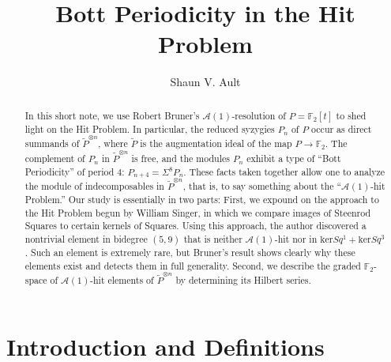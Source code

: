 \documentclass{amsart}
\theoremstyle{plain}
\theoremstyle{definition}
\theoremstyle{remark}
\begin{document}
\title{Bott Periodicity in the Hit Problem}

\author{Shaun V. Ault}

\address{Department of Mathematics and Computer Science\\ 
         Valdosta State University \\ 
         Valdosta, Georgia, 31698, USA.}




\begin{abstract}
  In this short note, we use Robert Bruner's
  $\mathcal{A}(1)$-resolution of $P = {\mathbb{F}}_2[t]$ to shed light on the
  Hit Problem.  In particular, the reduced syzygies $P_n$ of $P$ occur
  as direct summands of $\widetilde{P}^{\otimes n}$, where
  $\widetilde{P}$ is the augmentation ideal of the map $P \to {\mathbb{F}}_2$.
  The complement of $P_n$ in $\widetilde{P}^{\otimes n}$ is free, and
  the modules $P_n$ exhibit a type of ``Bott Periodicity'' of period
  $4$: $P_{n+4} = \Sigma^8P_n$.  These facts taken together allow one
  to analyze the module of indecomposables in $\widetilde{P}^{\otimes
    n}$, that is, to say something about the ``$\mathcal{A}(1)$-hit
  Problem.''  Our study is essentially in two parts: First, we expound
  on the approach to the Hit Problem begun by William Singer, in which
  we compare images of Steenrod Squares to certain kernels of Squares.
  Using this approach, the author discovered a nontrivial element in
  bidegree $(5, 9)$ that is neither $\mathcal{A}(1)$-hit nor in
  $\mathrm{ker} Sq^1 + \mathrm{ker} Sq^3$.  Such an element is
  extremely rare, but Bruner's result shows clearly why these elements
  exist and detects them in full generality.  Second, we describe the
  graded ${\mathbb{F}}_2$-space of $\mathcal{A}(1)$-hit elements of
  $\widetilde{P}^{\otimes n}$ by determining its Hilbert series.
\end{abstract}

\maketitle

\section{Introduction and Definitions}\label{sec.intro}
\end{document}
